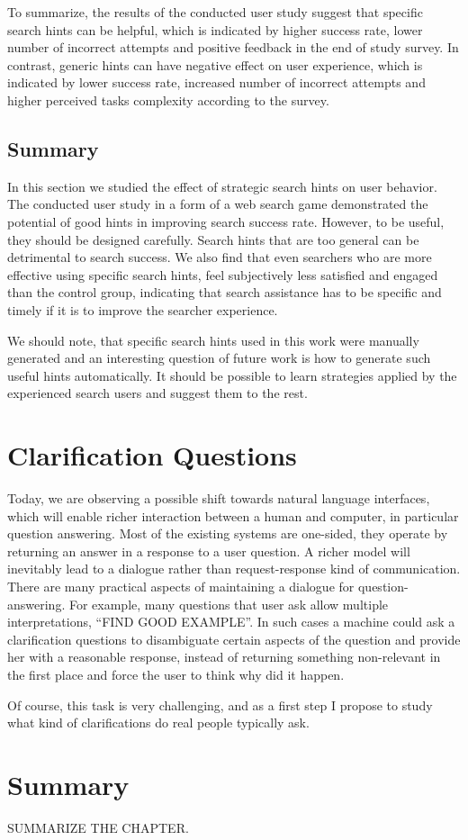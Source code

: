 To summarize, the results of the conducted user study suggest that specific search hints can be helpful, which is indicated by higher success rate, lower number of incorrect attempts and positive feedback in the end of study survey.
In contrast, generic hints can have negative effect on user experience, which is indicated by lower success rate, increased number of incorrect attempts and higher perceived tasks complexity according to the survey.

\subsection{Summary}
In this section we studied the effect of strategic search hints on user behavior. 
The conducted user study in a form of a web search game demonstrated the potential of good hints in improving search success rate.
However, to be useful, they should be designed carefully.
Search hints that are too general can be detrimental to search success.
We also find that even searchers who are more effective using specific search hints, feel subjectively less satisfied and engaged than the control group, indicating that search assistance has to be specific and timely if it is to improve the searcher experience.

We should note, that specific search hints used in this work were manually generated and an interesting question of future work is how to generate such useful hints automatically.
It should be possible to learn strategies applied by the experienced search users and suggest them to the rest.

\section{Clarification Questions}
\label{sec:user:clarification}

Today, we are observing a possible shift towards natural language interfaces, which will enable richer interaction between a human and computer, in particular question answering.
Most of the existing systems are one-sided, \ie they operate by returning an answer in a response to a user question.
A richer model will inevitably lead to a dialogue rather than request-response kind of communication.
There are many practical aspects of maintaining a dialogue for question-answering.
For example, many questions that user ask allow multiple interpretations, \eg ``FIND GOOD EXAMPLE''.
In such cases a machine could ask a clarification questions to disambiguate certain aspects of the question and provide her with a reasonable response, instead of returning something non-relevant in the first place and force the user to think why did it happen.

Of course, this task is very challenging, and as a first step I propose to study what kind of clarifications do real people typically ask.

\section{Summary}

SUMMARIZE THE CHAPTER.